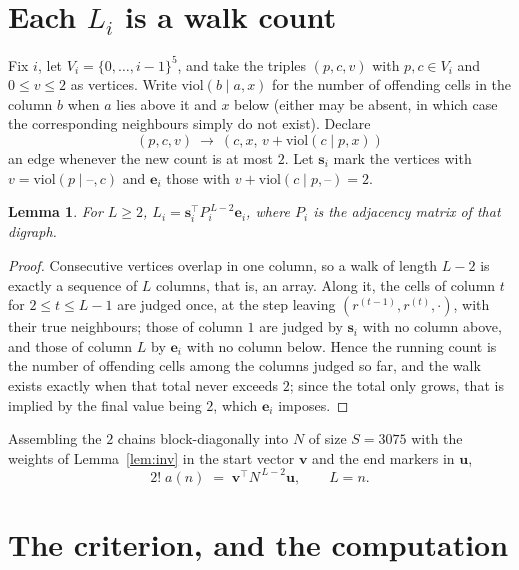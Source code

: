 \documentclass[11pt,a4paper]{article}
\theoremstyle{plain}
\newtheorem{lemma}[theorem]{Lemma}
\theoremstyle{definition}
\begin{document}
\section{Each $L_i$ is a walk count}

Fix $i$, let $V_i=\{0,\dots,i-1\}^{5}$, and take the triples $(p,c,v)$ with
$p,c\in V_i$ and $0\le v\le2$ as vertices. Write $\mathrm{viol}(b\mid a,x)$ for the number
of offending cells in the column $b$ when $a$ lies above it and $x$ below (either may be
absent, in which case the corresponding neighbours simply do not exist). Declare
\[
(p,c,v)\ \longrightarrow\ (c,x,\,v+\mathrm{viol}(c\mid p,x))
\]
an edge whenever the new count is at most $2$. Let $\mathbf{s}_i$ mark the vertices with
$v=\mathrm{viol}(p\mid\text{--},c)$ and $\mathbf{e}_i$ those with
$v+\mathrm{viol}(c\mid p,\text{--})=2$.

\begin{lemma}\label{lem:walk}
For $L\ge2$, $L_i=\mathbf{s}_i^{\!\top}P_i^{\,L-2}\mathbf{e}_i$, where $P_i$ is the
adjacency matrix of that digraph.
\end{lemma}

\begin{proof}
Consecutive vertices overlap in one column, so a walk of length $L-2$ is exactly a sequence
of $L$ columns, that is, an array. Along it, the cells of column $t$ for $2\le t\le L-1$ are
judged once, at the step leaving $(r^{(t-1)},r^{(t)},\cdot)$, with their true neighbours;
those of column $1$ are judged by $\mathbf{s}_i$ with no column above, and those of column
$L$ by $\mathbf{e}_i$ with no column below. Hence the running count is the number of
offending cells among the columns judged so far, and the walk exists exactly when that total
never exceeds $2$; since the total only grows, that is implied by the final value being
$2$, which $\mathbf{e}_i$ imposes.
\end{proof}

Assembling the $2$ chains block-diagonally into $N$ of size $S=3075$ with the weights of
Lemma~\ref{lem:inv} in the start vector $\mathbf{v}$ and the end markers in
$\mathbf{u}$,
\begin{equation}\label{eq:walk2}
2!\;a(n)\;=\;\mathbf{v}^{\!\top}N^{\,L-2}\mathbf{u},\qquad L=n .
\end{equation}

\section{The criterion, and the computation}
\end{document}
